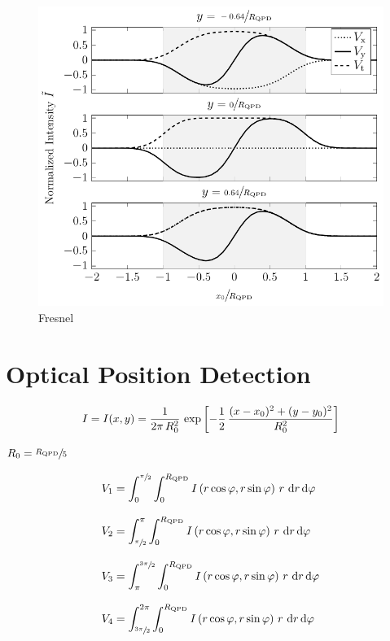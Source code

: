 \begin{figure}[tbp]
  \centering
  \includegraphics[]{Plots/cache/voltages_over_x.pdf}
  \caption{Fresnel}
  \label{fig:Th-voltages_over_x}
\end{figure}

\section{Optical Position Detection\label{sec:Th-QPD}}

\begin{equation}
  I = I(x, y) = \frac{1}{2\pi\,R_{0}^{2}}\,\exp\left[ 
  -\frac{1}{2}\,\frac{(x-x_{0})^{2} + (y - y_{0})^{2}}{R_{0}^{2}} \right]
    \label{eq:Th-intensity}
\end{equation}

$R_{0}=\sfrac{R_{\mathrm{QPD}}}{5}$


\begin{subequations}
\begin{align}
  V_{\mathrm{1}} & = \int_{0}^{\sfrac{\pi}{2}}\int_{0}^{R_{\mathrm{QPD}}}
  I\left( r\cos\varphi, r\sin\varphi \right)\,r\,\dd{r}\dd{\varphi} 
  \\[3mm]
  V_{\mathrm{2}} & = \int_{\sfrac{\pi}{2}}^{\pi}\int_{0}^{R_{\mathrm{QPD}}}
  I\left(r\cos\varphi, r\sin\varphi\right)\,r\,\dd{r}\dd{\varphi} 
  \\[3mm]
  V_{\mathrm{3}} & = \int_{\pi}^{\sfrac{3\pi}{2}}\int_{0}^{R_{\mathrm{QPD}}}
  I\left(r\cos\varphi, r\sin\varphi\right)\,r\,\dd{r}\dd{\varphi} 
  \\[3mm]
  V_{\mathrm{4}} & = \int_{\sfrac{3\pi}{2}}^{2\pi}\int_{0}^{R_{\mathrm{QPD}}}
  I\left(r\cos\varphi, r\sin\varphi\right)\,r\,\dd{r}\dd{\varphi}
\end{align}
\end{subequations}


